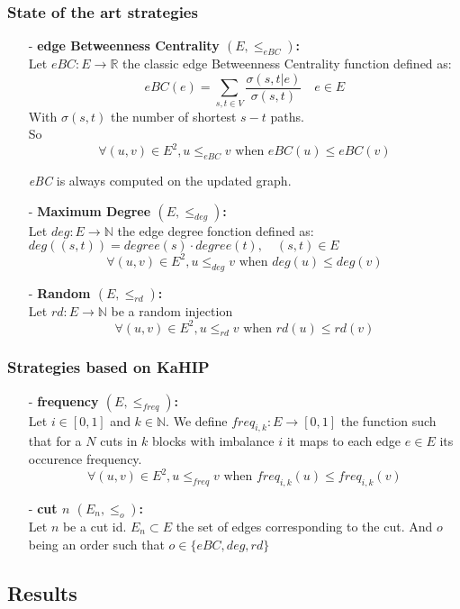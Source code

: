 \documentclass{article}
\newcommand{\R}{\mathds{R}}
\newcommand{\N}{\mathds{N}}
\newcommand{\leBC}{\leq_{eBC}}
\newcommand{\ldeg}{\leq_{deg}}
\newcommand{\lrd}{\leq_{rd}}
\newcommand{\lfreq}{\leq_{freq}}
\begin{document}
    \subsubsection{State of the art strategies}
    \begin{itemize}
        \item[-] \textbf{edge Betweenness Centrality $(E, \leBC)$:}\\
        Let $eBC: E \to \R$ the classic edge Betweenness Centrality function defined as:
        $$eBC(e) = \sum_{s, t \in V}\frac{\sigma(s, t | e)}{\sigma(s, t)} \quad e\in E$$
        With $\sigma(s, t)$ the number of shortest $s-t$ paths.\\
        So $$\forall (u, v) \in E^2, u \leBC v \text{ when } eBC(u) \leq eBC(v)$$

        \textit{eBC} is always computed on the updated graph.
        \item[-] \textbf{Maximum Degree $(E, \ldeg)$:}\\
        Let $deg: E \to \N$ the edge degree fonction defined as: $deg((s, t)) = degree(s) \cdot degree(t),\quad (s, t)\in E$
        $$\forall (u, v) \in E^2, u \ldeg v \text{ when } deg(u) \leq deg(v)$$
        \item[-] \textbf{Random $(E, \lrd)$:}\\
        Let $rd: E \to \N$ be a random injection
        $$\forall (u, v) \in E^2, u \lrd v \text{ when } rd(u) \leq rd(v)$$
    \end{itemize}
    \subsubsection{Strategies based on KaHIP}
    \begin{itemize}
        \item[-] \textbf{frequency $(E, \lfreq)$:}\\
        Let $i \in  [0, 1]$ and $k \in \N$. We define $freq_{i, k}: E \to [0, 1]$ the function such that for a $N$ cuts in $k$ blocks with imbalance $i$ it maps to each edge $e \in E$ its occurence frequency.
        $$\forall (u, v) \in E^2, u \lfreq v \text{ when } freq_{i, k}(u) \leq freq_{i, k}(v)$$
        \item[-] \textbf{cut $n$ $(E_n, \leq_o)$:}\\
        Let $n$ be a cut id. $E_n \subset E$ the set of edges corresponding to the cut. And $o$ being an order such that $o \in \{eBC, deg, rd\}$
    \end{itemize}
\subsection{Results}
\end{document}
